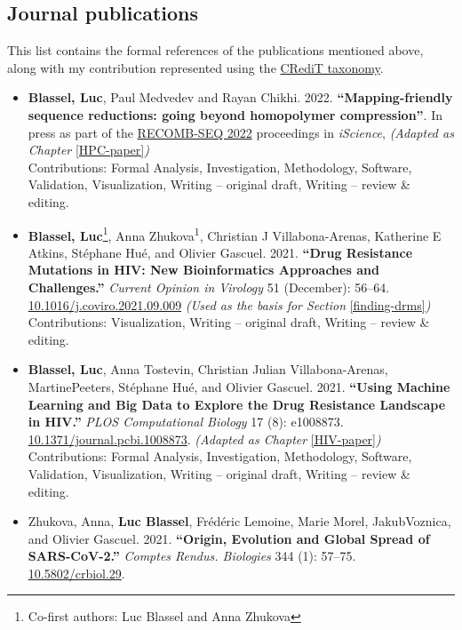 \documentclass[
  11pt,
  twoside,
  BCOR=10mm,
  listof=totoc]{scrbook}
\begin{document}
\hypertarget{journal-publications}{%
\subsection*{Journal publications}\label{journal-publications}}

This list contains the formal references of the publications mentioned above, along with my contribution represented using the \href{https://credit.niso.org/}{CRediT taxonomy}.

\begin{itemize}
\item
  \textbf{Blassel, Luc}, Paul Medvedev and Rayan Chikhi. 2022. \textbf{``Mapping-friendly sequence reductions: going beyond homopolymer compression''}. In press as part of the \href{https://recomb2022.net/recomb-seq/}{RECOMB-SEQ 2022} proceedings in \emph{iScience}, \emph{(Adapted as Chapter} \ref{HPC-paper}\emph{)\\
  }Contributions: Formal Analysis, Investigation, Methodology, Software, Validation, Visualization, Writing -- original draft, Writing -- review \& editing.
\item
  \textbf{Blassel, Luc}\footnote{Co-first authors: Luc Blassel and Anna Zhukova}, Anna Zhukova\textsuperscript{1}, Christian J Villabona-Arenas, Katherine E Atkins, Stéphane Hué, and Olivier Gascuel. 2021. \textbf{``Drug Resistance Mutations in HIV: New Bioinformatics Approaches and Challenges.''} \emph{Current Opinion in Virology} 51 (December): 56--64. \href{https://doi.org/10.1016/j.coviro.2021.09.009}{10.1016/j.coviro.2021.09.009} \emph{(Used as the basis for Section} \ref{finding-drms}\emph{)\\
  }Contributions: Visualization, Writing -- original draft, Writing -- review \& editing.
\item
  \textbf{Blassel, Luc}, Anna Tostevin, Christian Julian Villabona-Arenas, MartinePeeters, Stéphane Hué, and Olivier Gascuel. 2021. \textbf{``Using Machine Learning and Big Data to Explore the Drug Resistance Landscape in HIV.''} \emph{PLOS Computational Biology} 17 (8): e1008873. \href{https://doi.org/10.1371/journal.pcbi.1008873}{10.1371/journal.pcbi.1008873}. \emph{(Adapted as Chapter} \ref{HIV-paper}\emph{)\\
  }Contributions: Formal Analysis, Investigation, Methodology, Software, Validation, Visualization, Writing -- original draft, Writing -- review \& editing.
\item
  Zhukova, Anna, \textbf{Luc Blassel}, Frédéric Lemoine, Marie Morel, JakubVoznica, and Olivier Gascuel. 2021. \textbf{``Origin, Evolution and Global Spread of SARS-CoV-2.''} \emph{Comptes Rendus. Biologies} 344 (1): 57--75. \href{https://doi.org/10.5802/crbiol.29}{10.5802/crbiol.29}.\\

\end{itemize}
\end{document}
